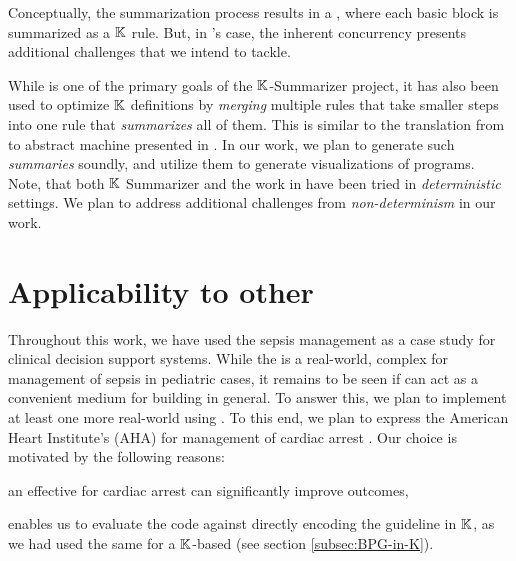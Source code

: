 Conceptually, the summarization process results in a \CFG{}, where
each basic block is summarized as a $\mathbb{K}$ rule. But, in \MediK{}'s
case, the inherent concurrency presents additional challenges
that we intend to tackle.

While \SBC{} is one of the primary goals of the $\mathbb{K}{}$-Summarizer
project, it has also been used to optimize $\mathbb{K}$ definitions
by \emph{merging} multiple rules that take smaller steps into
one rule that \emph{summarizes} all of them. This is similar
to the translation from \SOS{} to abstract machine presented in
\cite{KoppelICFP22}. In our work, we plan to generate such
\emph{summaries} soundly, and utilize them to generate visualizations
of \MediK{} programs. Note, that both $\mathbb{K}$ Summarizer and the work
in \cite{KoppelICFP22} have been tried in \emph{deterministic} settings.
We plan to address additional challenges from \emph{non-determinism} in our
work.

\section{Applicability to other \CDSSs{}}\label{subsec:applicability}

Throughout this work, we have used the sepsis management \BPG{} as
a case study for clinical decision support systems.
While the \BPG{} is a real-world, complex
\CDSSs{} for management of sepsis in pediatric cases, it remains
to be seen if \MediK{} can act as a convenient medium for building \CDSSs{} in general.
To answer this, we plan to implement at least one more real-world \CDSS{}
using \MediK{}. To this end, we plan to express the American Heart Institute's
(AHA) \BPG{} for management of cardiac arrest \cite{AHAUrl}. Our choice
is motivated by the following reasons:
\begin{enumerate*}[label=(\roman*)]
  \item an effective \CDSS{} for cardiac arrest can significantly improve
    outcomes,
  \item enables us to evaluate the \MediK{} code against directly encoding
    the guideline in $\mathbb{K}$, as we had used the same \BPG{} for a $\mathbb{K}$-based \CDSSs{}
    (see section \ref{subsec:BPG-in-K}).
\end{enumerate*}








%
%

